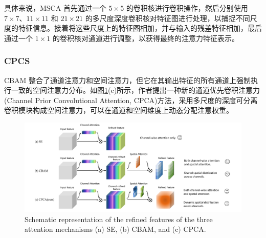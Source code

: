 \documentclass[a4paper]{ctexart}
\begin{document}
	具体来说，MSCA 首先通过一个 $5 \times 5$ 的卷积核进行卷积操作，然后分别使用 $7 \times 7$、$11 \times 11$ 和 $21 \times 21$ 的多尺度深度卷积核对特征图进行处理，以捕捉不同尺度的特征信息。接着将这些尺度上的特征图相加，并与输入的残差特征相加，最后通过一个 $1 \times 1$ 的卷积核对通道进行调整，以获得最终的注意力特征表示。
	
	\subsubsection*{CPCS}
	
	
	CBAM 整合了通道注意力和空间注意力，但它在其输出特征的所有通道上强制执行一致的空间注意力分布。如图\ref{fig: SE_CBAM_CPCA}(c)所示，作者\cite{huang2023channel}提出一种新的通道优先卷积注意力(Channel Prior Convolutional Attention, CPCA)方法，采用多尺度的深度可分离卷积模块构成空间注意力，可以在通道和空间维度上动态分配注意权重。
	
	\begin{figure}[htbp]
		\centering
		\includegraphics[width=0.8\linewidth]{picture/LLIE/Experiment/Attention/SE_CBAM_CPCA}
		\caption{Schematic representation of the refined features of the three attention mechanisms (a) SE, (b) CBAM, and (c) CPCA.}
		\label{fig: SE_CBAM_CPCA}
	\end{figure}
	
\end{document}

